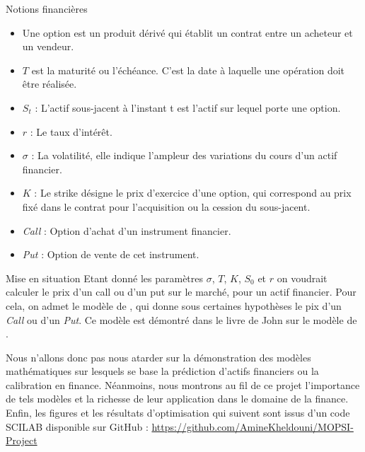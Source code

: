\documentclass[final]{beamer}
\newlength{\onecolwid}
\begin{document}
\begin{frame}[t]
\begin{columns}[t]
\begin{column}{\onecolwid}
\vspace{2cm}
\begin{block}{Notions financières}
  \begin{itemize}
    \item Une option est un produit dérivé qui établit un contrat entre un acheteur et un vendeur.
    \item $T$ est la maturité ou l'échéance. C'est la date à laquelle une opération doit être réalisée.
    \item $S_t$ : L'actif sous-jacent à l'instant t est l'actif sur lequel porte une option.
    \item $r$ : Le taux d'intérêt.
    \item $\sigma$ : La volatilité, elle indique l'ampleur des variations du cours d'un actif financier.
    \item $K$ : Le strike désigne le prix d'exercice d'une option, qui correspond au prix fixé dans le contrat pour l’acquisition ou la cession du sous-jacent.
    \item \textit{Call} : Option d'achat d'un instrument financier.
    \item \textit{Put} : Option de vente de cet instrument.
  \end{itemize}
  \vspace{1cm}
  \begin{alertblock}{Mise en situation}
    Etant donné les paramètres $\sigma$, $T$, $K$, $S_0$ et $r$ on voudrait calculer le prix d'un call ou d'un put sur le marché, pour un actif financier.
    \newline
    Pour cela, on admet le modèle de , qui donne sous certaines hypothèses le pix d'un \textit{Call} ou d'un \textit{Put}. Ce modèle est démontré dans le livre de John   sur le modèle de .
    \newline
  \end{alertblock}
  Nous n'allons donc pas nous atarder sur la démonstration des modèles mathématiques sur lesquels se base la prédiction d'actifs financiers ou la calibration en finance. Néanmoins, nous montrons au fil de ce projet l'importance de tels modèles et la richesse de leur application dans le domaine de la finance.
  \newline
  Enfin, les figures et les résultats d'optimisation qui suivent sont issus d'un code SCILAB disponible sur GitHub : \url{https://github.com/AmineKheldouni/MOPSI-Project}
\end{block}


\end{column}
\end{columns}
\end{frame}
\end{document}
